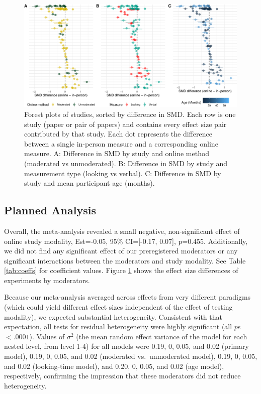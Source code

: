 \documentclass[
  man,floatsintext]{apa6}
\begin{document}
\begin{figure}[h]

{\centering \includegraphics[width=1\linewidth]{OnlineMA_main_files/figure-latex/forest-1} 

}

\caption{Forest plots of studies, sorted by difference in SMD. Each row is one study (paper or pair of papers) and contains every effect size pair contributed by that study. Each dot represents the difference between a single in-person measure and a corresponding online measure. A: Difference in SMD by study and online method (moderated vs unmoderated). B: Difference in SMD by study and measurement type (looking vs verbal). C: Difference in SMD by study and mean participant age (months).}\label{fig:forest}
\end{figure}

\hypertarget{planned-analysis}{%
\subsection{Planned Analysis}\label{planned-analysis}}

Overall, the meta-analysis revealed a small negative, non-significant effect of online study modality, Est=-0.05, 95\% CI={[}-0.17, 0.07{]}, p=0.455. Additionally, we did not find any significant effect of our preregistered moderators or any significant interactions between the moderators and study modality. See Table \ref{tab:coeffs} for coefficient values. Figure \ref{fig:forest} shows the effect size differences of experiments by moderators.

Because our meta-analysis averaged across effects from very different paradigms (which could yield different effect sizes independent of the effect of testing modality), we expected substantial heterogeneity. Consistent with that expectation, all tests for residual heterogeneity were highly significant (all \(p\)s \(< .0001\)). Values of \(\sigma^2\) (the mean random effect variance of the model for each nested level, from level 1-4) for all models were 0.19, 0, 0.05, and 0.02 (primary model), 0.19, 0, 0.05, and 0.02 (moderated vs.~unmoderated model), 0.19, 0, 0.05, and 0.02 (looking-time model), and 0.20, 0, 0.05, and 0.02 (age model), respectively, confirming the impression that these moderators did not reduce heterogeneity.
\end{document}
